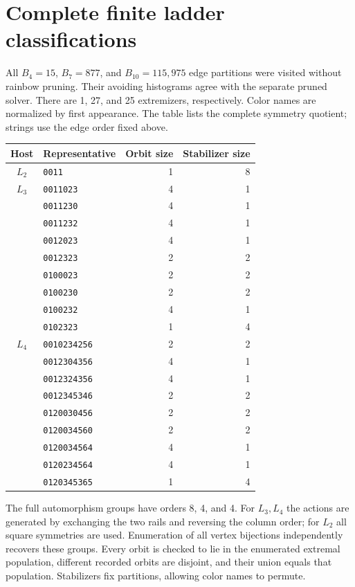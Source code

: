 \documentclass[11pt,letterpaper]{article}
\begin{document}
\section{Complete finite ladder classifications}
All $B_4=15$, $B_7=877$, and $B_{10}=115{,}975$ edge partitions were visited
without rainbow pruning. Their avoiding histograms agree with the separate
pruned solver. There are 1, 27, and 25 extremizers, respectively.
Color names are normalized by first appearance. The table lists the complete
symmetry quotient; strings use the edge order fixed above.
\begin{center}\small
\begin{tabular}{clrr}
\toprule
Host & Representative & Orbit size & Stabilizer size\\
\midrule
$L_2$ & \texttt{0011} & 1 & 8\\
\midrule
$L_3$ & \texttt{0011023} & 4 & 1\\
 & \texttt{0011230} & 4 & 1\\
 & \texttt{0011232} & 4 & 1\\
 & \texttt{0012023} & 4 & 1\\
 & \texttt{0012323} & 2 & 2\\
 & \texttt{0100023} & 2 & 2\\
 & \texttt{0100230} & 2 & 2\\
 & \texttt{0100232} & 4 & 1\\
 & \texttt{0102323} & 1 & 4\\
\midrule
$L_4$ & \texttt{0010234256} & 2 & 2\\
 & \texttt{0012304356} & 4 & 1\\
 & \texttt{0012324356} & 4 & 1\\
 & \texttt{0012345346} & 2 & 2\\
 & \texttt{0120030456} & 2 & 2\\
 & \texttt{0120034560} & 2 & 2\\
 & \texttt{0120034564} & 4 & 1\\
 & \texttt{0120234564} & 4 & 1\\
 & \texttt{0120345365} & 1 & 4\\
\bottomrule
\end{tabular}
\end{center}
The full automorphism groups have orders 8, 4, and 4. For $L_3,L_4$ the
actions are generated by exchanging the two rails and reversing the column
order; for $L_2$ all square symmetries are used. Enumeration of all vertex
bijections independently recovers these groups. Every orbit is checked to
lie in the enumerated extremal population, different recorded orbits are
disjoint, and their union equals that population. Stabilizers fix partitions,
allowing color names to permute.
\end{document}
